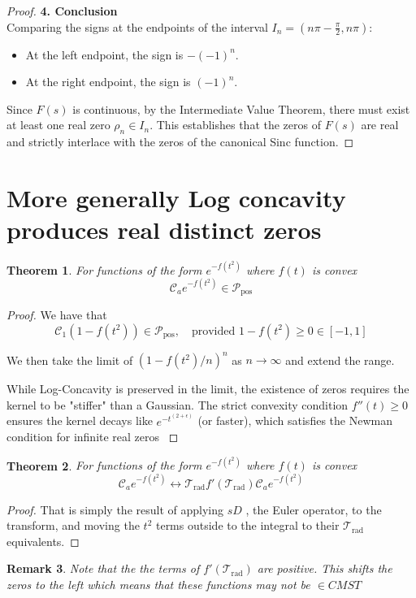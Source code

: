 \documentclass[11pt]{article}
\theoremstyle{breakdef}
\newtheorem{theorem}{Theorem}[section]
\newtheorem{remark}[theorem]{Remark}
\begin{document}
\begin{proof}
\noindent \textbf{4. Conclusion} \\
Comparing the signs at the endpoints of the interval $I_n = (n\pi - \frac{\pi}{2}, n\pi)$:
\begin{itemize}
    \item At the left endpoint, the sign is $-(-1)^n$.
    \item At the right endpoint, the sign is $(-1)^n$.
\end{itemize}
Since $F(s)$ is continuous, by the Intermediate Value Theorem, there must exist at least one real zero $\rho_n \in I_n$.
This establishes that the zeros of $F(s)$ are real and strictly interlace with the zeros of the canonical Sinc function.
\end{proof}

\section{More generally Log concavity produces real distinct zeros}
\begin{theorem}
For functions of the form $e^{-f(t^2)}$ where $f(t)$ is convex 
\begin{equation}
\mathcal{C}_{a} e^{-f(t^2)} \in \mathcal{P}_{\mathrm{pos}}
\end{equation}

\end{theorem}
\begin{proof}
We have that
\begin{equation}
\mathcal{C}_{1} (1-f(t^2)) \in \mathcal{P}_{\mathrm{pos}} , \quad \text{provided }  1-f(t^2) \ge 0 \in [-1,1]
\end{equation}

We then take the limit of $(1-f(t^2)/n)^n$ as $n \to \infty$ and extend the range.

While Log-Concavity is preserved in the limit, the existence of zeros requires the kernel to be
 "stiffer" than a Gaussian. The strict convexity condition $f''(t) \ge 0$ ensures the kernel decays like
  $e^{-t^{(2+\epsilon)}}$  (or faster), which satisfies the Newman condition for infinite real zeros \cite{Newman1976}

\end{proof}
\begin{theorem}
For functions of the form $e^{-f(t^2)}$ where $f(t)$ is convex 
\begin{equation}
\mathcal{C}_{a} e^{-f(t^2)} \leftrightarrow  \mathcal{T}_{\text{rad}}f'(\mathcal{T}_{\text{rad}}) \mathcal{C}_{a} e^{-f(t^2)}
\end{equation}
\end{theorem}
\begin{proof}
That is simply the result of applying $sD$ , the Euler operator, to the transform, and moving the $t^2$ terms outside to the integral to their $\mathcal{T}_{\text{rad}}$ equivalents.
\end{proof}
\begin{remark}
Note that the the terms of  $f'(\mathcal{T}_{\text{rad}})$ are positive.  This shifts the zeros to the left which means that these functions may not be $\in CMST$ 
\end{remark}
\end{document}
